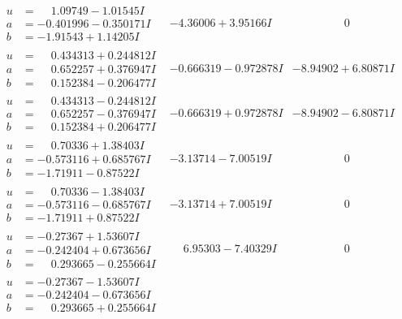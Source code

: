 \documentclass[1p]{elsarticle_modified}
\theoremstyle{definition}
\begin{document}
$$\begin{array}{c|c|c}
 \hline 
\begin{aligned}
u &= \phantom{-}1.09749 - 1.01545 I \\
a &= -0.401996 - 0.350171 I \\
b &= -1.91543 + 1.14205 I\end{aligned}
 & -4.36006 + 3.95166 I & \phantom{-0.000000 } 0 \\ \hline\begin{aligned}
u &= \phantom{-}0.434313 + 0.244812 I \\
a &= \phantom{-}0.652257 + 0.376947 I \\
b &= \phantom{-}0.152384 - 0.206477 I\end{aligned}
 & -0.666319 - 0.972878 I & -8.94902 + 6.80871 I \\ \hline\begin{aligned}
u &= \phantom{-}0.434313 - 0.244812 I \\
a &= \phantom{-}0.652257 - 0.376947 I \\
b &= \phantom{-}0.152384 + 0.206477 I\end{aligned}
 & -0.666319 + 0.972878 I & -8.94902 - 6.80871 I \\ \hline\begin{aligned}
u &= \phantom{-}0.70336 + 1.38403 I \\
a &= -0.573116 + 0.685767 I \\
b &= -1.71911 - 0.87522 I\end{aligned}
 & -3.13714 - 7.00519 I & \phantom{-0.000000 } 0 \\ \hline\begin{aligned}
u &= \phantom{-}0.70336 - 1.38403 I \\
a &= -0.573116 - 0.685767 I \\
b &= -1.71911 + 0.87522 I\end{aligned}
 & -3.13714 + 7.00519 I & \phantom{-0.000000 } 0 \\ \hline\begin{aligned}
u &= -0.27367 + 1.53607 I \\
a &= -0.242404 + 0.673656 I \\
b &= \phantom{-}0.293665 - 0.255664 I\end{aligned}
 & \phantom{-}6.95303 - 7.40329 I & \phantom{-0.000000 } 0 \\ \hline\begin{aligned}
u &= -0.27367 - 1.53607 I \\
a &= -0.242404 - 0.673656 I \\
b &= \phantom{-}0.293665 + 0.255664 I\end{aligned}

\end{array}$$
\end{document}
